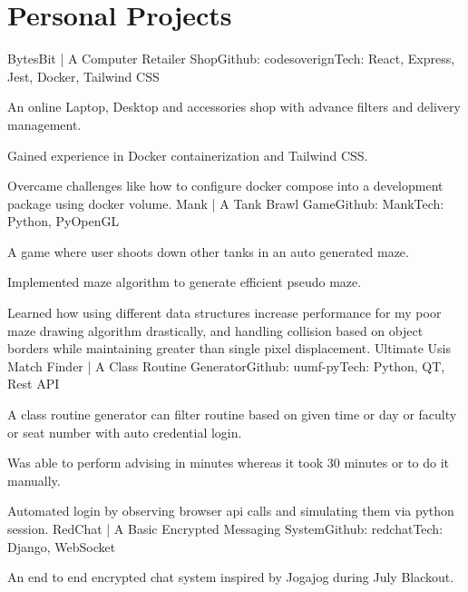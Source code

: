 
\section{\textbf{Personal Projects}}
\resumeSubHeadingListStart
    \resumeProject
      {BytesBit | A Computer Retailer Shop}{Github: codesoverign}{Tech: React, Express, Jest, Docker, Tailwind CSS}{}
      \resumeItemListStart
        \item {An online Laptop, Desktop and accessories shop with advance filters and delivery management.}
        \item {Gained experience in Docker containerization and Tailwind CSS.}
        \item {Overcame challenges like how to configure docker compose into a development package using docker volume.}
      \resumeItemListEnd
    \vspace{-2mm}
    \resumeProject
      {Mank | A Tank Brawl Game}{Github: Mank}{Tech: Python, PyOpenGL}{}
      \resumeItemListStart
        \item {A game where user shoots down other tanks in an auto generated maze.}
        \item {Implemented maze algorithm to generate efficient pseudo maze.}
        \item {Learned how using different data structures increase performance for my poor maze drawing algorithm drastically, and handling collision based on object borders while maintaining greater than single pixel displacement.}
      \resumeItemListEnd
    \vspace{-2mm}
    \resumeProject
      {Ultimate Usis Match Finder | A Class Routine Generator}{Github: uumf-py}{Tech: Python, QT, Rest API}{}
      \resumeItemListStart
        \item {A class routine generator can filter routine based on given time or day or faculty or seat number with auto credential login.}
        \item {Was able to perform advising in minutes whereas it took 30 minutes or to do it manually.}
        \item {Automated login by observing browser api calls and simulating them via python session.}
      \resumeItemListEnd
    \vspace{-2mm}
    \resumeProject
      {RedChat | A Basic Encrypted Messaging System}{Github: redchat}{Tech: Django, WebSocket}{}
      \resumeItemListStart
        \item {An end to end encrypted chat system inspired by Jogajog during July Blackout.}
